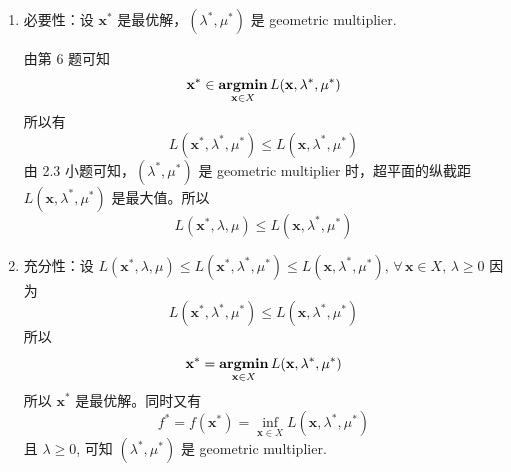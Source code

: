 \documentclass[11pt,letter,notitlepage]{article}
\DeclareMathOperator*{\argmin}{\bf argmin}
\begin{document}
\begin{solution}
	\begin{enumerate}
		\item 必要性：设 $\mathbf{x}^*$ 是最优解，$(\lambda^*,\mu^*)$ 是 geometric multiplier.

		      由第 6 题可知
		      $$\mathbf{x}^* \in \argmin_{\mathbf{x}\in X} L(\mathbf{x},\lambda^*,\mu^*)$$
		      所以有
		      $$L(\mathbf{x}^*,\lambda^*,\mu^*) \leq L(\mathbf{x},\lambda^*,\mu^*)$$
		      由 2.3 小题可知，$(\lambda^*,\mu^*)$ 是 geometric multiplier 时，超平面的纵截距 $L(\mathbf{x},\lambda^*,\mu^*)$ 是最大值。所以
		      $$L(\mathbf{x}^*,\lambda,\mu) \leq L(\mathbf{x},\lambda^*,\mu^*)$$
		\item 充分性：设 $L(\mathbf{x}^*,\lambda,\mu)\leq L(\mathbf{x}^*,\lambda^*,\mu^*)\leq L(\mathbf{x},\lambda^*,\mu^*),\,\forall\,\mathbf{x}\in X,\,\lambda\geq0$
		      因为
		      $$L(\mathbf{x}^*,\lambda^*,\mu^*) \leq L(\mathbf{x},\lambda^*,\mu^*)$$
		      所以
		      $$\mathbf{x}^*=\argmin_{\mathbf{x}\in X} L(\mathbf{x},\lambda^*,\mu^*)$$
		      所以 $\mathbf{x}^*$ 是最优解。同时又有
		      $$f^*=f(\mathbf{x}^*)=\inf_{\mathbf{x}\in X} L(\mathbf{x},\lambda^*,\mu^*)$$
		      且 $\lambda \geq0$, 可知 $(\lambda^*,\mu^*)$ 是 geometric multiplier.
	\end{enumerate}
\end{solution}
\end{document}
